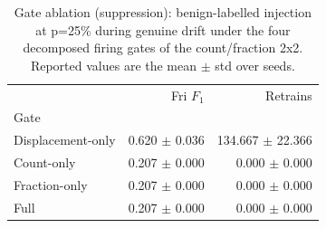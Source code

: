 \begin{table}
\caption{Gate ablation (suppression): benign-labelled injection at p=25\% during genuine drift under the four decomposed firing gates of the count/fraction 2x2. Reported values are the mean $\pm$ std over seeds.}
\label{tab:rq3-gate-suppression}
\centering
\begin{tabular}{lrr}
\toprule
 & Fri $F_1$ & Retrains \\
Gate &  &  \\
\midrule
Displacement-only & 0.620 $\pm$ 0.036 & 134.667 $\pm$ 22.366 \\
Count-only & 0.207 $\pm$ 0.000 & 0.000 $\pm$ 0.000 \\
Fraction-only & 0.207 $\pm$ 0.000 & 0.000 $\pm$ 0.000 \\
Full & 0.207 $\pm$ 0.000 & 0.000 $\pm$ 0.000 \\
\bottomrule
\end{tabular}
\end{table}
